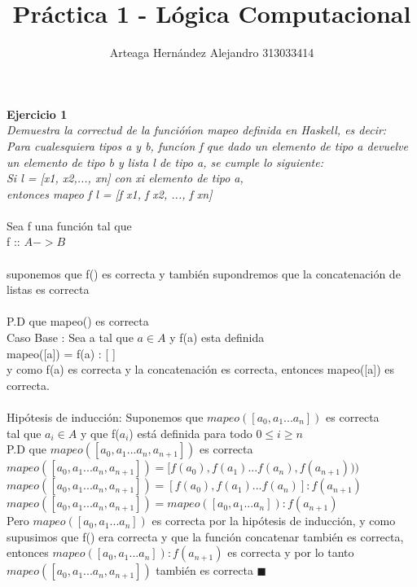 \documentclass[12pt]{article}
\title{Práctica 1 - Lógica Computacional}
\author{Arteaga Hernández Alejandro 313033414}
\begin{document}
 

\maketitle
 \textbf{Ejercicio 1 \\}
\textit{Demuestra la correctud de la funcióńon mapeo definida en Haskell, es decir:\\
Para cualesquiera tipos a y b, funcíon f que dado un elemento de tipo a devuelve un
elemento de tipo b y lista l de tipo a, se cumple lo siguiente: \\
Si l = [x1, x2,..., xn] con xi elemento de tipo a,\\ entonces
mapeo  f l = [f x1, f x2, ..., f xn]\\}\\ 
Sea f una función tal que \\
f :: $A -> B$\\\\
suponemos que f() es correcta y también supondremos que la concatenación de listas es correcta\\\\
P.D que mapeo() es correcta\\
Caso Base :  Sea a tal que $a \in A $ y f(a) esta definida\\  mapeo([a]) = f(a) : [ ]\\ y como f(a) es correcta y la concatenación es correcta,
entonces mapeo([a]) es correcta.\\\\
Hipótesis de inducción: Suponemos que $mapeo([a_{0},a_{1}...a_{n}])$ es correcta\\
tal que $a_{i} \in A $ y que f($a_{i}$) está definida para todo $0\leq i \geq n$ 
\\
P.D que $mapeo([a_{0},a_{1}...a_{n},a_{n+1}])$ es correcta\\
$mapeo([a_{0},a_{1}...a_{n},a_{n+1}]) = [f(a_{0}),f(a_{1})...f(a_{n}),f(a_{n+1})))$\\
$mapeo([a_{0},a_{1}...a_{n},a_{n+1}]) = [f(a_{0}),f(a_{1})...f(a_{n})] : f(a_{n+1})$\\
$mapeo([a_{0},a_{1}...a_{n},a_{n+1}]) = mapeo([a_{0},a_{1}...a_{n}]) : f(a_{n+1})$\\
Pero $mapeo([a_{0},a_{1}...a_{n}])$ es correcta por la hipótesis de inducción, y como supusimos que f() era correcta y que la función concatenar también es correcta, entonces $mapeo([a_{0},a_{1}...a_{n}]) : f(a_{n+1})$ es correcta y por lo tanto
$mapeo([a_{0},a_{1}...a_{n},a_{n+1}])$ también es correcta $\blacksquare$
\end{document}
